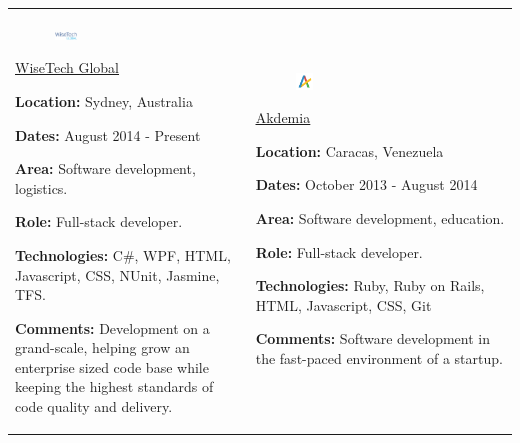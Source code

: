 \documentclass[10pt]{article}
\begin{document}
\begin{tabular}[t]{ll}
	\parbox{0.45\textwidth}
	{
		\begin{figure}
			\includegraphics[width=0.15\textwidth]{wtg}
		\end{figure}

		\begin{center}
			\underline{\href{https://http://www.wisetechglobal.com/}{WiseTech Global}}
		\end{center}

		\textbf{Location:} Sydney, Australia

		\textbf{Dates:} August 2014 - Present
	
		\textbf{Area:} Software development, logistics.
	
		\textbf{Role:} Full-stack developer.
	
		\textbf{Technologies:} C\#, WPF, HTML, Javascript, CSS, NUnit, Jasmine, TFS.
	
		\textbf{Comments:} Development on a grand-scale, helping grow an enterprise sized code base while keeping the highest standards of code quality and delivery.
	}

	&

	\parbox{0.45\textwidth}
	{
		\begin{figure}
			\includegraphics[width=0.10\textwidth]{akdemia}
		\end{figure}

		\begin{center}
			\underline{\href{https://www.akdemia.com}{Akdemia}}
		\end{center}

		\textbf{Location:} Caracas, Venezuela

		\textbf{Dates:} October 2013 - August 2014
	
		\textbf{Area:} Software development, education.
	
		\textbf{Role:} Full-stack developer.
	
		\textbf{Technologies:} Ruby, Ruby on Rails, HTML, Javascript, CSS, Git
	
		\textbf{Comments:} Software development in the fast-paced environment of a startup.
	}


\end{tabular}
\end{document}
